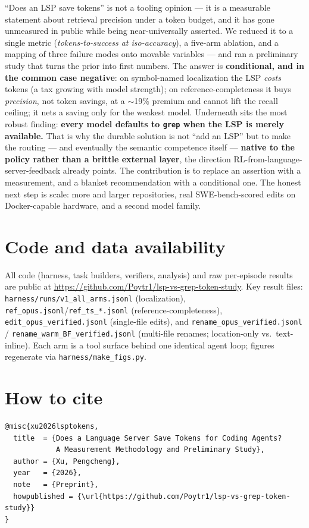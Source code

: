 \documentclass[11pt]{article}
\newcommand{\code}[1]{\texttt{#1}}
\begin{document}
``Does an LSP save tokens'' is not a tooling opinion --- it is a measurable statement about retrieval
precision under a token budget, and it has gone unmeasured in public while being near-universally
asserted. We reduced it to a single metric (\emph{tokens-to-success at iso-accuracy}), a five-arm
ablation, and a mapping of three failure modes onto movable variables --- and ran a preliminary study that turns the
prior into first numbers. The answer is \textbf{conditional, and in the common case negative}: on
symbol-named localization the LSP \emph{costs} tokens (a tax growing with model strength); on
reference-completeness it buys \emph{precision}, not token savings, at a $\sim$19\% premium and cannot
lift the recall ceiling; it nets a saving only for the weakest model. Underneath sits the most robust
finding: \textbf{every model defaults to \code{grep} when the LSP is merely available.} That is why the
durable solution is not ``add an LSP'' but to make the routing --- and eventually the semantic competence
itself --- \textbf{native to the policy rather than a brittle external layer}, the direction
RL-from-language-server-feedback already points. The contribution is to replace an assertion with a
measurement, and a blanket recommendation with a conditional one. The honest next step is scale: more and
larger repositories, real SWE-bench-scored edits on Docker-capable hardware, and a second model family.

\section*{Code and data availability}
All code (harness, task builders, verifiers, analysis) and raw per-episode results are public at
\url{https://github.com/Poytr1/lsp-vs-grep-token-study}. Key result files: \code{harness/runs/v1\_all\_arms.jsonl}
(localization), \code{ref\_opus.jsonl}/\code{ref\_ts\_*.jsonl} (reference-completeness),
\code{edit\_opus\_verified.jsonl} (single-file edits), and \code{rename\_opus\_verified.jsonl} /
\code{rename\_warm\_BF\_verified.jsonl} (multi-file renames; location-only vs.\ text-inline). Each arm is a
tool surface behind one identical agent loop; figures regenerate via \code{harness/make\_figs.py}.

\section*{How to cite}
\begin{verbatim}
@misc{xu2026lsptokens,
  title  = {Does a Language Server Save Tokens for Coding Agents?
            A Measurement Methodology and Preliminary Study},
  author = {Xu, Pengcheng},
  year   = {2026},
  note   = {Preprint},
  howpublished = {\url{https://github.com/Poytr1/lsp-vs-grep-token-study}}
}
\end{verbatim}
\end{document}
